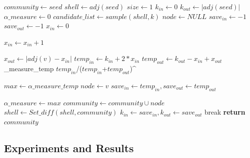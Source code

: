 \documentclass[a4paper]{article}
\begin{document}
\begin{algorithm}
\caption{$Community\_detection (seed, k, \alpha)$}
\begin{algorithmic}[1]
\State $ community\gets seed$        
\State $ shell\gets adj(seed)$        
\State $ size\gets 1$
\State $ k_{in} \gets 0$
\State $ k_{out} \gets |adj(seed)|$
\State $ \alpha\_measure\gets 0$ 
\State $candidate\_list\gets sample(shell, k)$
\State $node \gets NULL$
\State $save_{in}\gets -1$
\State $save_{out}\gets -1$
\State $x_{in}\gets 0$


          

\State $x_{in} \gets x_{in}+1$

\EndIf
\EndFor

\State $x_{out} \gets |adj(v) - x_{in}|$
\State $temp_{in} \gets k_{in}+2*x_{in}$
\State $temp_{out} \gets k_{out}-x_{in}+x_{out}$
\State \alpha\_measure\_temp \gets  $temp_{in}$/{($temp_{in}$+$temp_{out}$)^\alpha}

\State $max\gets \alpha\_measure\_temp$
\State $node \gets v$
\State $save_{in} \gets temp_{in}, save_{out} \gets temp_{out}$
\EndIf
\EndFor

\State $\alpha\_measure \gets max$
\State $community \gets community \cup node$ 
\State $shell \gets Set\_diff(shell, community)$
\State $k_{in} \gets save_{in}, k_{out} \gets save_{out}$
\Else \State break
\EndIf
\EndFor
\EndWhile
\State \textbf{return} $community$
\EndProcedure
\end{algorithmic}
\end{algorithm}




\subsection{Experiments and Results}
\end{document}
